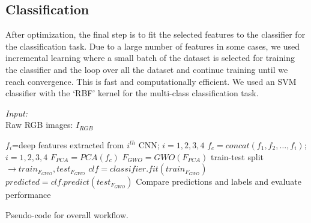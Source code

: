\documentclass{llncs}
\begin{document}
\subsection{Classification}
After optimization, the final step is to fit the selected features to the classifier for the classification task. Due to a large number of features in some cases, we used incremental learning where a small batch of the dataset is selected for training the classifier and the loop over all the dataset and continue training until we reach convergence. This is fast and computationally efficient. We used an SVM classifier with the ‘RBF’ kernel for the multi-class classification task.
\begin{algorithm}
    {\em Input:}\\
    Raw RGB images: $I_{RGB}$
    \begin{algorithmic}
        \STATE $f_i$=deep features extracted from $i^{th}$ CNN; $i={1,2,3,4}$
        \STATE $f_{c}=concat(f_1,f_2,\hdots,f_i)$;$i={1,2,3,4}$  
        \STATE $F_{PCA}=PCA(f_{c})$ 
        \STATE $F_{GWO}=GWO(F_{PCA})$ 
        \STATE train-test split$\to train_{F_{GWO}},test_{F_{GWO}}$
        \STATE $clf=classifier.fit(train_{F_{GWO}})$ 
        \STATE $predicted=clf.predict(test_{F_{GWO}})$ 
        \STATE Compare predictions and labels and evaluate performance
    \end{algorithmic}
    \caption{Pseudo-code for overall workflow.}
    \label{algooverall}
\end{algorithm}
\end{document}
